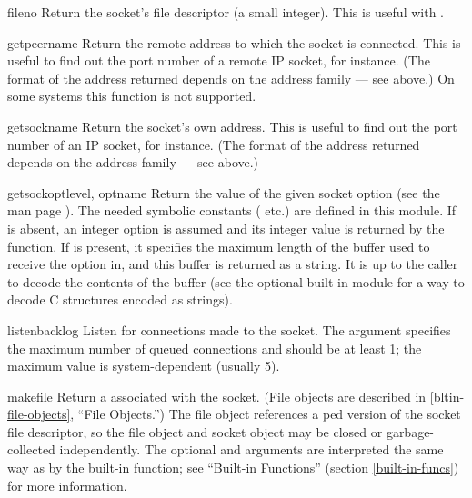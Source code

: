 \begin{methoddesc}[socket]{fileno}{}
Return the socket's file descriptor (a small integer).  This is useful
with .
\end{methoddesc}

\begin{methoddesc}[socket]{getpeername}{}
Return the remote address to which the socket is connected.  This is
useful to find out the port number of a remote IP socket, for instance.
(The format of the address returned depends on the address family ---
see above.)  On some systems this function is not supported.
\end{methoddesc}

\begin{methoddesc}[socket]{getsockname}{}
Return the socket's own address.  This is useful to find out the port
number of an IP socket, for instance.
(The format of the address returned depends on the address family ---
see above.)
\end{methoddesc}

\begin{methoddesc}[socket]{getsockopt}{level, optname}
Return the value of the given socket option (see the \UNIX{} man page
).  The needed symbolic constants
( etc.) are defined in this module.  If 
is absent, an integer option is assumed and its integer value
is returned by the function.  If  is present, it specifies
the maximum length of the buffer used to receive the option in, and
this buffer is returned as a string.  It is up to the caller to decode
the contents of the buffer (see the optional built-in module
 for a way to decode C structures encoded as strings).
\end{methoddesc}

\begin{methoddesc}[socket]{listen}{backlog}
Listen for connections made to the socket.  The  argument
specifies the maximum number of queued connections and should be at
least 1; the maximum value is system-dependent (usually 5).
\end{methoddesc}

\begin{methoddesc}[socket]{makefile}{}
Return a  associated with the socket.  (File objects
are described in \ref{bltin-file-objects}, ``File Objects.'')
The file object references a ped version of the
socket file descriptor, so the file object and socket object may be
closed or garbage-collected independently.
The optional 
and  arguments are interpreted the same way as by the
built-in  function; see ``Built-in Functions''
(section \ref{built-in-funcs}) for more information.
\end{methoddesc}

